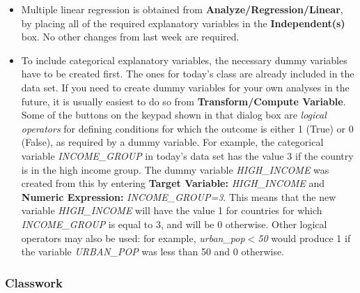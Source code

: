 \begin{itemize}
\item
Multiple linear regression is obtained from
\textbf{Analyze/Regression/Linear}, by placing all of the
required explanatory variables in the \textbf{Independent(s)} box. No
other changes from last week are required.
\item
To include categorical explanatory variables, the necessary
dummy variables have to be created first. The ones for today's
class are already included in the data set. If you need to create dummy
variables for your own analyses in the future, it is usually
easiest to do so from \textbf{Transform/Compute Variable}.
Some of the buttons on the keypad shown
in that dialog box are \emph{logical operators} for defining conditions for which the outcome is either 1
(True) or 0 (False), as required by a dummy variable. For example, the
categorical variable \emph{INCOME\_GROUP} in today's data set has the value 3
if the country is in the high income group. The dummy variable \emph{HIGH\_INCOME} was created
from this by entering \textbf{Target Variable:} \emph{HIGH\_INCOME} and \textbf{Numeric
Expression:} \emph{INCOME\_GROUP=3}. This means that the new
variable \emph{HIGH\_INCOME} will have the value 1 for countries for which
\emph{INCOME\_GROUP} is equal to 3, and will be 0 otherwise.
Other logical operators may also be used: for example,
\emph{urban\_pop$<$50} would produce 1 if the variable
\emph{URBAN\_POP} was less than
50 and 0 otherwise.
\end{itemize}

\vspace*{-5ex}
\subsubsection{Classwork}

